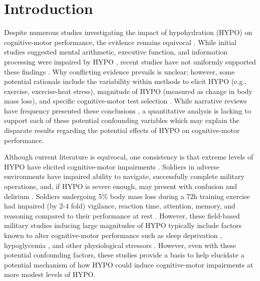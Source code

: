 \section{Introduction}
Despite numerous studies investigating the impact of hypohydration (HYPO) on cognitive-motor performance, the evidence remains equivocal \cite{grandjean_dehydration_2007,masento_effects_2014,lieberman_hydration_2007,wilson_impaired_2003}. While initial studies suggested mental arithmetic, executive function, and information processing were impaired by HYPO \cite{gopinathan_role_1988, sharma_influence_1986}, recent studies have not uniformly supported these findings \cite{adam_hydration_2008, ely_hypohydration_2013}. Why conflicting evidence prevails is unclear; however, some potential rationale include the variability within methods to elicit HYPO (e.g., exercise, exercise-heat stress), magnitude of HYPO (measured as change in body mass loss), and specific cognitive-motor test selection \cite{lieberman_hydration_2007, lieberman_methods_2012,masento_effects_2014}. While narrative reviews have frequency presented these conclusions \cite{masento_effects_2014, lieberman_methods_2012, grandjean_dehydration_2007}, a quantitative analysis is lacking to support each of these potential confounding variables which may explain the disparate results regarding the potential effects of HYPO on cognitive-motor performance. 

Although current literature is equivocal, one consistency is that extreme levels of HYPO have elicited cognitive-motor impairments \cite{king_brief_1878, adolf_physiology_1947}. Soldiers in adverse environments have impaired ability to navigate, successfully complete military operations, and, if HYPO is severe enough, may present with confusion and delirium \cite{king_brief_1878,adolf_physiology_1947}. Soldiers undergoing 5\% body mass loss during a 72h training exercise had impaired (by 2-4 fold) vigilance, reaction time, attention, memory, and reasoning compared to their performance at rest \cite{lieberman_severe_2005}. However, these field-based military studies inducing large magnitudes of HYPO typically include factors known to alter cognitive-motor performance such as sleep deprivation \cite{krause_sleep-deprived_2017}, hypoglycemia \cite{strachan_acute_2001}, and other physiological stressors \cite{opstad_performance_1978}. However, even with these potential confounding factors, these studies provide a basis to help elucidate a potential mechanism of how HYPO could induce cognitive-motor impairments at more modest levels of HYPO.

